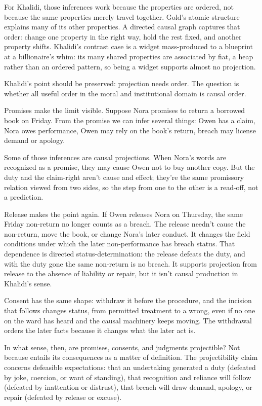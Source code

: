 \documentclass[12pt]{article}
\begin{document}
For Khalidi, those inferences work because the properties are ordered, not because the same properties merely travel together. Gold's atomic structure explains many of its other properties. A directed causal graph captures that order: change one property in the right way, hold the rest fixed, and another property shifts. Khalidi's contrast case is a widget mass-produced to a blueprint at a billionaire's whim: its many shared properties are associated by fiat, a heap rather than an ordered pattern, so being a widget supports almost no projection.

Khalidi's point should be preserved: projection needs order. The question is whether all useful order in the moral and institutional domain is causal order.

Promises make the limit visible. Suppose Nora promises to return a borrowed book on Friday. From the promise we can infer several things: Owen has a claim, Nora owes performance, Owen may rely on the book's return, breach may license demand or apology.

Some of those inferences are causal projections. When Nora's words are recognized as a promise, they may cause Owen not to buy another copy. But the duty and the claim-right aren't cause and effect; they're the same promissory relation viewed from two sides, so the step from one to the other is a read-off, not a prediction.

Release makes the point again. If Owen releases Nora on Thursday, the same Friday non-return no longer counts as a breach. The release needn't cause the non-return, move the book, or change Nora's later conduct. It changes the field conditions under which the later non-performance has breach status. That dependence is directed status-determination: the release defeats the duty, and with the duty gone the same non-return is no breach. It supports projection from release to the absence of liability or repair, but it isn't causal production in Khalidi's sense.

Consent has the same shape: withdraw it before the procedure, and the incision that follows changes status, from permitted treatment to a wrong, even if no one on the ward has heard and the causal machinery keeps moving. The withdrawal orders the later facts because it changes what the later act is.

In what sense, then, are promises, consents, and judgments projectible? Not because  entails its consequences as a matter of definition. The projectibility claim concerns defeasible expectations: that an undertaking generated a duty (defeated by joke, coercion, or want of standing), that recognition and reliance will follow (defeated by inattention or distrust), that breach will draw demand, apology, or repair (defeated by release or excuse).
\end{document}
